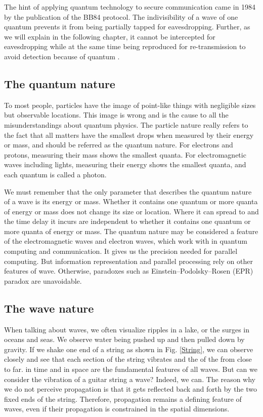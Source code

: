 \documentclass[Letter,11pt]{book}
\begin{document}
The hint of applying quantum technology to secure communication came in 1984 by the publication of the BB84 protocol\cite{BB84}. The indivisibility of a wave of one quantum prevents it from being partially tapped for eavesdropping. Further, as we will explain in the following chapter, it cannot be intercepted for eavesdropping while at the same time being reproduced for re-transmission to avoid detection because of quantum .

\subsection{The quantum nature}
To most people, particles have the image of point-like things with negligible sizes but observable locations. This image is wrong and is the cause to all the misunderstandings about quantum physics. The particle nature really refers to the fact that all matters have the smallest drops when measured by their energy or mass, and should be referred as the quantum nature. For electrons and protons, measuring their mass shows the smallest quanta. For electromagnetic waves including lights, measuring their energy shows the smallest quanta, and each quantum is called a photon.

We must remember that the only parameter that describes the quantum nature of a wave is its energy or mass. Whether it contains one quantum or more quanta of energy or mass does not change its size or location. Where it can spread to and the time delay it incurs are independent to whether it contains one quantum or more quanta of energy or mass. The quantum nature may be considered a feature of the electromagnetic waves and electron waves, which work with in quantum computing and communication. It gives us the precision needed for parallel computing. But information representation and parallel processing rely on other features of wave. Otherwise, paradoxes such as Einstein–Podolsky–Rosen (EPR) paradox \cite{EPR} are unavoidable.

\subsection{The wave nature}
When talking about waves, we often visualize ripples in a lake, or the surges in oceans and seas. We observe water being pushed up and then pulled down by gravity. If we shake one end of a string as shown in Fig. \ref{String}, we can observe closely and see that each section of the string vibrates and the  of the  from close to far.  in time and  in space are the fundamental features of all waves. But can we consider the vibration of a guitar string a wave? Indeed, we can. The reason why we do not perceive propagation is that it gets reflected back and forth by the two fixed ends of the string. Therefore, propagation remains a defining feature of waves, even if their propagation is constrained in the spatial dimensions.
\end{document}
